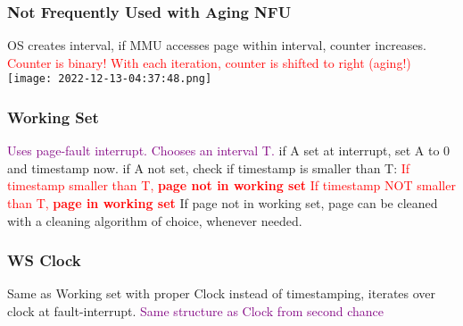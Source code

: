\documentclass[main.tex,fontsize=8pt,paper=a4,paper=landscape,DIV=calc,]{scrartcl}
\begin{document}
\begin{multicols*}{4}
\subsubsection{Not Frequently Used with Aging NFU}
OS creates interval, if MMU accesses page within interval, counter increases.\newline
\textcolor{red}{Counter is binary! With each iteration, counter is shifted to right (aging!)}\newline
\texttt{[image: 2022-12-13-04:37:48.png]}

\subsubsection{Working Set}
\textcolor{purple}{Uses page-fault interrupt. Chooses an interval T.}\newline
if A set at interrupt, set A to 0 and timestamp now.\newline
if A not set, check if timestamp is smaller than T:\newline
\textcolor{red}{If timestamp smaller than T, \textbf{page not in working set}}\newline
\textcolor{red}{If timestamp NOT smaller than T, \textbf{page in working set}}\newline
If page not in working set, page can be cleaned with a cleaning algorithm of choice, whenever needed.

\subsubsection{WS Clock}
Same as Working set with proper Clock instead of timestamping, iterates over clock at fault-interrupt.\newline
\textcolor{purple}{Same structure as Clock from second chance}

\end{multicols*}
\end{document}
